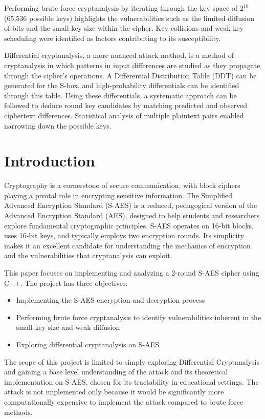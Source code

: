 \documentclass{article}
\begin{document}
Performing brute force cryptanalysis by iterating through the key space of \(2^{16}\) (65,536 possible keys) highlights the vulnerabilities such as the limited diffusion of bits and the small key size within the cipher. Key collisions and weak key scheduling were identified as factors contributing to its susceptibility.

Differential cryptanalysis, a more nuanced attack method, is a method of cryptanalysis in which patterns in input differences are studied as they propagate through the cipher's operations. A Differential Distribution Table (DDT) can be generated for the S-box, and high-probability differentials can be identified through this table. Using these differentials, a systematic approach can be followed to deduce round key candidates by matching predicted and observed ciphertext differences. Statistical analysis of multiple plaintext pairs enabled narrowing down the possible keys.
\newpage


\section{Introduction}
Cryptography is a cornerstone of secure communication, with block ciphers playing a pivotal role in encrypting sensitive information. The Simplified Advanced Encryption Standard (S-AES) is a reduced, pedagogical version of the Advanced Encryption Standard (AES), designed to help students and researchers explore fundamental cryptographic principles. S-AES operates on 16-bit blocks, uses 16-bit keys, and typically employs two encryption rounds. Its simplicity makes it an excellent candidate for understanding the mechanics of encryption and the vulnerabilities that cryptanalysis can exploit.

This paper focuses on implementing and analyzing a 2-round S-AES cipher using C++. The project has three objectives:
\begin{itemize}
    \item Implementing the S-AES encryption and decryption process
    \item Performing brute force cryptanalysis to identify vulnerabilities inherent in the small key size and weak diffusion
    \item Exploring differential cryptanalysis on S-AES
\end{itemize}

The scope of this project is limited to simply exploring Differential Cryptanalysis and gaining a base level understanding of the attack and its theoretical implementation on S-AES, chosen for its tractability in educational settings. The attack is not implemented only because it would be significantly more computationally expensive to implement the attack compared to brute force methods.
\newpage
\end{document}

